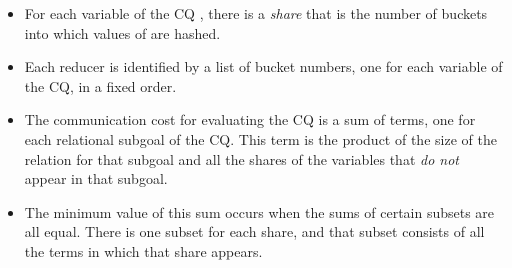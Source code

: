 \begin{itemize}

\item
For each variable of the CQ , there is a {\em share}  that is the number of buckets into which values of  are hashed.

\item
Each reducer is identified by a list of bucket numbers, one for each variable of the CQ, in a fixed order.

\item
The communication cost for evaluating the CQ is a sum of terms, one for each relational subgoal of the CQ.  This term is the product of the size of the relation for that subgoal and all the shares of the variables that {\em do not} appear in that subgoal.

\item
The minimum value of this sum occurs when the sums of certain subsets are all equal.  There is one subset for each share, and that subset consists of all the terms in which that share appears.

\end{itemize}

